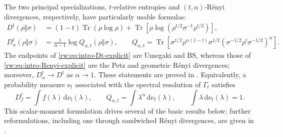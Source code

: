\documentclass[11pt]{article}
\theoremstyle{remark}
\newcommand{\1}{\mathbbm{1}}
\begin{document}
The two principal specializations, $t$-relative entropies and $(t,\alpha)$-Rényi divergences, respectively, have particularly usable formulas:
\begin{align}
 D^t(\rho\Vert\sigma)
 &=(1-t)\operatorname{Tr}(\rho\log\rho)
 +\operatorname{Tr}\!\left[
 \rho\log\!\left(\rho^{t/2}\sigma^{-1}\rho^{t/2}\right)
 \right],
 \label{rw:eq:intro-Dt-explicit}\\
 D_\alpha^t(\rho\Vert\sigma)
 &=\frac{1}{\alpha-1}\log Q_{\alpha,t}(\rho\Vert\sigma),
 \qquad
 Q_{\alpha,t}
 =\operatorname{Tr}\!\left[
  \sigma^{1/2}\rho^{\alpha(1-t)}\sigma^{1/2}
  \left(\sigma^{-1/2}\rho^t\sigma^{-1/2}\right)^\alpha
 \right].
 \label{rw:eq:intro-Renyi-explicit}
\end{align}
The endpoints of \eqref{rw:eq:intro-Dt-explicit} are Umegaki and BS,
whereas those of \eqref{rw:eq:intro-Renyi-explicit} are the Petz and
geometric R\'enyi divergences; moreover,
$D_\alpha^t\to D^t$ as $\alpha\to1$.  These statements are proved in
.
Equivalently, a probability measure $\nu_t$ associated with the
spectral resolution of $\Gamma_t$ satisfies
\begin{equation*}
 D_f^t=\int f(\lambda)\,\mathrm d\nu_t(\lambda),
 \qquad
 Q_{\alpha,t}=\int\lambda^\alpha\,\mathrm d\nu_t(\lambda),
 \qquad
 \int\lambda\,\mathrm d\nu_t(\lambda)=1.
\end{equation*}
This scalar-moment formulation drives several of the basic results
below; further reformulations, including one through sandwiched
R\'enyi divergences, are given in
.
\end{document}
